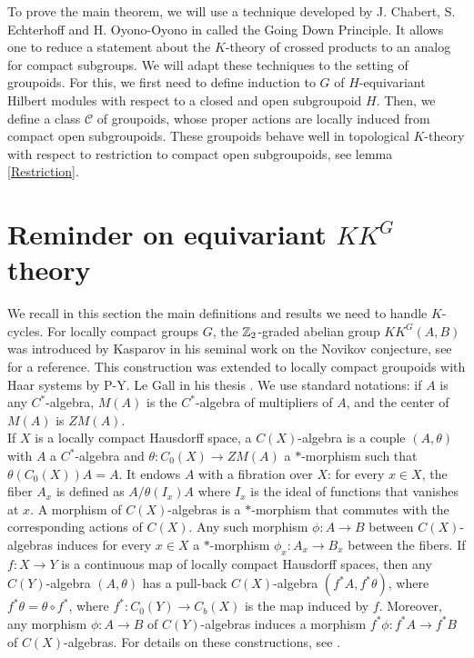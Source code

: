 To prove the main theorem, we will use a technique developed by J. Chabert, S. Echterhoff and H. Oyono-Oyono in \cite{ChabertEOY} called the Going Down Principle. It allows one to reduce a statement about the $K$-theory of crossed products to an analog for compact subgroups. We will adapt these techniques to the setting of groupoids. For this, we first need to define induction to $G$ of $H$-equivariant Hilbert modules with respect to a closed and open subgroupoid $H$. Then, we define a class $\mathcal C$ of groupoids, whose proper actions are locally induced from compact open subgroupoids. These groupoids behave well in topological $K$-theory with respect to restriction to compact open subgroupoids, see lemma \ref{Restriction}.

\section{Reminder on equivariant $KK^G$ theory}

We recall in this section the main definitions and results we need to handle $K$-cycles. For locally compact groups $G$, the $\mathbb Z_2$-graded abelian group $KK^G(A,B)$ was introduced by Kasparov in his seminal work on the Novikov conjecture, see \cite{KasparovNovikov} for a reference. This construction was extended to locally compact groupoids with Haar systems by P-Y. Le Gall in his thesis \cite{LeGall}. We use standard notations: if $A$ is any $C^*$-algebra, $M(A)$ is the $C^*$-algebra of multipliers of $A$, and the center of $M(A)$ is $ZM(A)$.\\

If $X$ is a locally compact Hausdorff space, a $C(X)$-algebra is a couple $(A,\theta )$ with $A$ a $C^*$-algebra and $\theta : C_0(X)\rightarrow Z M(A)$ a $*$-morphism such that $\theta(C_0(X)) A  = A$. It endows $A$ with a fibration over $X$: for every $x\in X$, the fiber $A_x$ is defined as $A/ \theta (I_x)A$ where $I_x$ is the ideal of functions that vanishes at $x$. A morphism of $C(X)$-algebras is a $*$-morphism that commutes with the corresponding actions of $C(X)$. Any such morphism $\phi : A\rightarrow B$ between $C(X)$-algebras induces for every $x\in X$ a $*$-morphism $\phi_x: A_x \rightarrow B_x$ between the fibers. If $f: X \rightarrow Y$ is a continuous map of locally compact Hausdorff spaces, then any $C(Y)$-algebra $(A,\theta)$ has a pull-back $C(X)$-algebra $(f^*A, f^* \theta)$, where $f^*\theta = \theta \circ f^*$, where $f^* : C_0(Y)\rightarrow C_b(X)$ is the map induced by $f$. Moreover, any morphism $\phi: A\rightarrow B $ of $C(Y)$-algebras induces a morphism $f^*\phi : f^*A \rightarrow f^*B $ of $C(X)$-algebras. For details on these constructions, see \cite{LeGall}.\\ 

